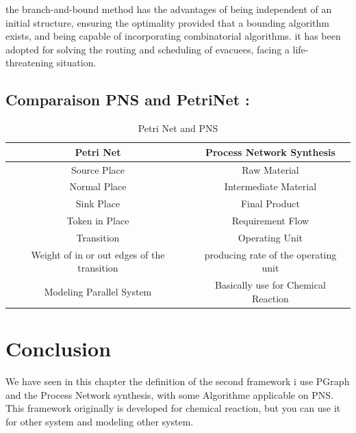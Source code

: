the branch-and-bound method has the
advantages of being independent of an initial structure, 
ensuring the optimality provided that a bounding algorithm exists, and being capable of incorporating
combinatorial algorithms\cite{algo}.
it has been adopted for solving the routing and scheduling of evacuees, facing a life-threatening situation\cite{pns4}. 

\subsection{ Comparaison PNS and PetriNet : }
\begin {table}[H] 
\begin{tabular}{cc}

\hline 
\textbf{Petri Net}  & \textbf{Process Network Synthesis}\tabularnewline
\hline 
Source Place  & Raw Material\tabularnewline
Normal Place  & Intermediate Material\tabularnewline
Sink Place  & Final Product\tabularnewline
Token in Place  & Requirement Flow \tabularnewline
Transition  & Operating Unit \tabularnewline
Weight of in or out edges of the  transition & producing rate of the operating unit\tabularnewline
\hline 
Modeling Parallel System  & Basically use for Chemical Reaction \tabularnewline
\hline 

\end{tabular}
\caption {Petri Net and PNS}
 
\end {table}

\section{Conclusion}
We have seen in this chapter the definition of the second framework i use
PGraph and the Process Network synthesis, with some Algorithme applicable on PNS.
This framework originally is developed for chemical reaction, but you can use it for other system and modeling other system.

